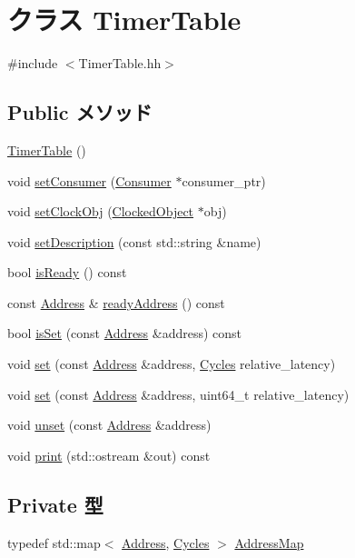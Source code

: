 \hypertarget{classTimerTable}{
\section{クラス TimerTable}
\label{classTimerTable}
}


{\ttfamily \#include $<$TimerTable.hh$>$}\subsection*{Public メソッド}
\begin{DoxyCompactItemize}
\item 
\hyperlink{classTimerTable_a962081e7b878ea1c7019cc69a78dc8f2}{TimerTable} ()
\item 
void \hyperlink{classTimerTable_a8487c37680239f103e21ada9acf1726d}{setConsumer} (\hyperlink{classConsumer}{Consumer} $\ast$consumer\_\-ptr)
\item 
void \hyperlink{classTimerTable_abc72aeeb43ac97f6a2e2a003f050bb06}{setClockObj} (\hyperlink{classClockedObject}{ClockedObject} $\ast$obj)
\item 
void \hyperlink{classTimerTable_a9cdbe64eebafb111a124edec55ed2340}{setDescription} (const std::string \&name)
\item 
bool \hyperlink{classTimerTable_ac12eec09d47a89a1ddf3eb6bb19b5bd3}{isReady} () const 
\item 
const \hyperlink{classAddress}{Address} \& \hyperlink{classTimerTable_af365d2a04bb754f7422868d41432909a}{readyAddress} () const 
\item 
bool \hyperlink{classTimerTable_af88cb5939b3467b1d758aef5ec470283}{isSet} (const \hyperlink{classAddress}{Address} \&address) const 
\item 
void \hyperlink{classTimerTable_a7e2c839d59092594ac3fd757ae2f617c}{set} (const \hyperlink{classAddress}{Address} \&address, \hyperlink{classCycles}{Cycles} relative\_\-latency)
\item 
void \hyperlink{classTimerTable_ada47cc37e5c46401dbac71cf3972a211}{set} (const \hyperlink{classAddress}{Address} \&address, uint64\_\-t relative\_\-latency)
\item 
void \hyperlink{classTimerTable_ac54af1e5e959f0027f639c741609ab0a}{unset} (const \hyperlink{classAddress}{Address} \&address)
\item 
void \hyperlink{classTimerTable_ac55fe386a101fbae38c716067c9966a0}{print} (std::ostream \&out) const 
\end{DoxyCompactItemize}
\subsection*{Private 型}
\begin{DoxyCompactItemize}
\item 
typedef std::map$<$ \hyperlink{classAddress}{Address}, \hyperlink{classCycles}{Cycles} $>$ \hyperlink{classTimerTable_aafe31722aec34a121c4566b713a7a5e8}{AddressMap}
\end{DoxyCompactItemize}
